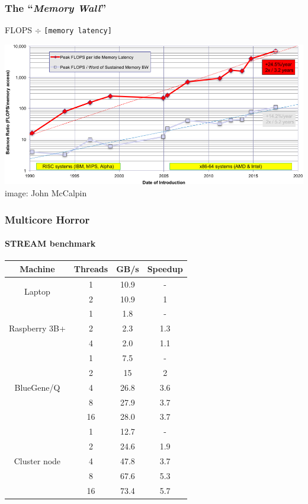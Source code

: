 \documentclass[xcolor={x11names,svgnames}]{beamer}
\begin{document}
\begin{frame}
  \frametitle{The ``\emph{Memory Wall}''}

  \begin{center}
    \large FLOPS $\div$ \texttt{[memory latency]}
  \end{center}

  \bigskip

  \includegraphics[width=\textwidth]{calpin_wall_latence.png}
    \flushright image: John McCalpin
\end{frame}


\begin{frame}
  \frametitle{Multicore Horror}
  \framesubtitle{STREAM benchmark}
  
  \smallskip
  
  \small
  \centering
\begin{tabular}{|cc|c|c|}
  \hline
  Machine         & Threads & GB/s & Speedup \\
    \hline  \hline
  \multirow{2}{*}{Laptop}          & 1 & 10.9  & -\\
            & 2 & 10.9  & \alert{1} \\
  \hline
  \multirow{3}{*}{Raspberry 3B+}       & 1  & 1.8  & - \\
         & 2  & 2.3  & \alert{1.3} \\
         & 4  & 2.0  & \alert{1.1} \\
  \hline
  \multirow{5}{*}{BlueGene/Q}      & 1  & 7.5  & -\\ 
        & 2  & 15   & 2\\
        & 4  & 26.8 & 3.6 \\
        & 8  & 27.9 & \alert{3.7} \\
        & 16 & 28.0 & \alert{3.7} \\ 
  \hline
  \multirow{5}{*}{Cluster node}    & 1  & 12.7 & - \\
      & 2  & 24.6 & 1.9 \\
      & 4  & 47.8 & 3.7 \\
      & 8  & 67.6 & {\color{orange} 5.3} \\
      & 16 & 73.4 & \alert{5.7} \\
  \hline
\end{tabular}
\end{frame}
\end{document}
